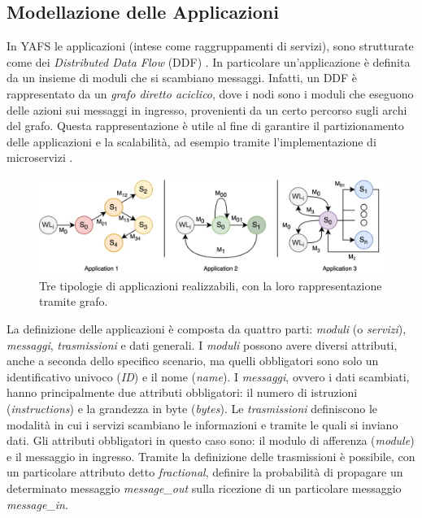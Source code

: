 \subsection{Modellazione delle Applicazioni}
In YAFS le applicazioni (intese come raggruppamenti di servizi), sono strutturate come dei \textit{Distributed Data Flow} (DDF) \cite{DDF_IOT_App}. In particolare un'applicazione è definita da un insieme di moduli che si scambiano messaggi. Infatti, un DDF è rappresentato da un \textit{grafo diretto aciclico}, dove i nodi sono i moduli che eseguono delle azioni sui messaggi in ingresso, provenienti da un certo percorso sugli archi del grafo. Questa rappresentazione è utile al fine di garantire il partizionamento delle applicazioni e la scalabilità, ad esempio tramite l'implementazione di microservizi \cite{microservices}. 

\begin{figure}[!ht]
  \includegraphics[width=14cm]{images/applications_ddf}
  \centering
  \caption{Tre tipologie di applicazioni realizzabili, con la loro rappresentazione tramite grafo.\cite{YAFSSimulator}}
  \label{fig:applications_ddf}
\end{figure}

La definizione delle applicazioni è composta da quattro parti: \textit{moduli} (o \textit{servizi}), \textit{messaggi}, \textit{trasmissioni} e dati generali. I \textit{moduli} possono avere diversi attributi, anche a seconda dello specifico scenario, ma quelli obbligatori sono solo un identificativo univoco (\textit{ID}) e il nome (\textit{name}). I \textit{messaggi}, ovvero i dati scambiati, hanno principalmente due attributi obbligatori: il numero di istruzioni (\textit{instructions}) e la grandezza in byte (\textit{bytes}). Le \textit{trasmissioni} definiscono le modalità in cui i servizi scambiano le informazioni e tramite le quali si inviano dati. Gli attributi obbligatori in questo caso sono: il modulo di afferenza (\textit{module}) e il messaggio in ingresso. Tramite la definizione delle trasmissioni è possibile, con un particolare attributo detto \textit{fractional}, definire la probabilità di propagare un determinato messaggio \textit{message\_out} sulla ricezione di un particolare messaggio \textit{message\_in}. 

